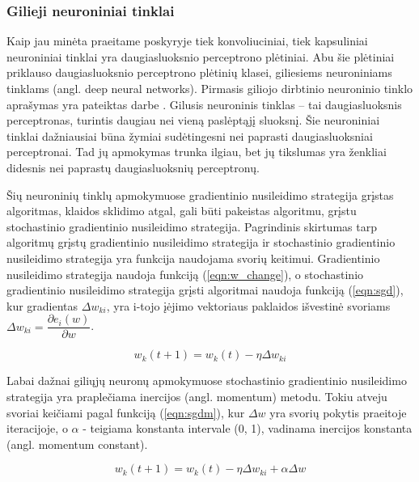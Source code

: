 \subsubsection{Gilieji neuroniniai tinklai}

Kaip jau minėta praeitame poskyryje tiek konvoliuciniai, tiek kapsuliniai neuroniniai tinklai yra daugiasluoksnio perceptrono plėtiniai. Abu šie plėtiniai priklauso daugiasluoksnio perceptrono plėtinių klasei, giliesiems neuroniniams tinklams (angl. deep neural networks). Pirmasis giliojo dirbtinio neuroninio tinklo aprašymas yra pateiktas darbe \cite{deepNN}. Gilusis neuroninis tinklas -- tai daugiasluoksnis perceptronas, turintis daugiau nei vieną paslėptąjį sluoksnį. Šie neuroniniai tinklai dažniausiai būna žymiai sudėtingesni nei paprasti daugiasluoksniai perceptronai. Tad jų apmokymas trunka ilgiau, bet jų tikslumas yra ženkliai didesnis nei paprastų daugiasluoksnių perceptronų.

Šių neuroninių tinklų apmokymuose gradientinio nusileidimo strategija grįstas algoritmas, klaidos sklidimo atgal, gali būti pakeistas algoritmu, grįstu stochastinio gradientinio nusileidimo strategija. Pagrindinis skirtumas tarp algoritmų grįstų gradientinio nusileidimo strategija ir stochastinio gradientinio nusileidimo strategija yra funkcija naudojama svorių keitimui. Gradientinio nusileidimo strategija naudoja funkciją (\ref{eqn:w_change}), o stochastinio gradientinio nusileidimo strategija grįsti algoritmai naudoja funkciją (\ref{eqn:sgd}), kur gradientas $\Delta w_{ki}$, yra i-tojo įėjimo vektoriaus paklaidos išvestinė svoriams $\Delta w_{ki} = \dfrac{\partial e_i(w)}{\partial w}$.

\begin{equation}
\label{eqn:sgd}
	w_k(t + 1) = w_k(t) - \eta \Delta w_{ki}
\end{equation}



Labai dažnai giliųjų neuronų apmokymuose stochastinio gradientinio nusileidimo strategija yra praplečiama inercijos (angl. momentum) metodu. Tokiu atveju svoriai keičiami pagal funkciją (\ref{eqn:sgdm}), kur $\Delta w$ yra svorių pokytis praeitoje iteracijoje, o $\alpha$ - teigiama konstanta intervale (0, 1), vadinama inercijos konstanta (angl. momentum constant).

\begin{equation}
\label{eqn:sgdm}
	w_k(t + 1) = w_k(t) - \eta \Delta w_{ki} + \alpha \Delta w
\end{equation}

